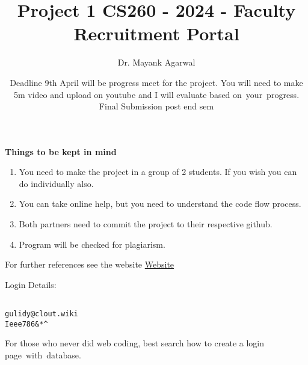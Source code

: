 \documentclass{article}
\title{Project 1 CS260 - 2024 -  Faculty Recruitment Portal}
\author{Dr. Mayank Agarwal}
\date{ Deadline 9th April will be progress meet for the project. You will need to make 5m video and upload on youtube and I will evaluate based on your progress. Final Submission post end sem }
\begin{document}
	\maketitle  
	\textbf{Things to be kept in mind} 
	\begin{enumerate}
\item You need to make the project in a group of 2 students. If you wish you 
can do individually also.  

\item You can take online help, but you need to understand the code flow 
process.

\item Both partners need to commit the project to their respective github. 

\item Program will be checked for plagiarism.   
\end{enumerate}


For further references see the website \href{https://ofa.iiti.ac.in/facrec_che_2023_july_02/faculty/login}{Website}
 
Login Details:
\begin{verbatim}

gulidy@clout.wiki
Ieee786&*^
\end{verbatim}

For those who never did web coding, best search how to create a login page with database. 


\end{document}
